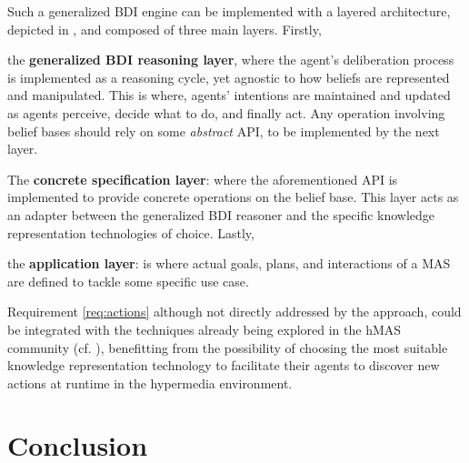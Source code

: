 \documentclass[
]{ceurart}
\begin{document}
Such a generalized \ac{BDI} engine can be implemented with a layered architecture,
depicted in , and composed of three main layers.
%
Firstly,
\begin{enumerate*}[label={\arabic*.}]
  \item the \textbf{generalized \ac{BDI} reasoning layer},
  where the agent's deliberation process is implemented as a reasoning cycle,
  yet agnostic to how beliefs are represented and manipulated.
  This is where,
  agents' intentions are maintained
  and updated as agents perceive,
  decide what to do,
  and finally act.
  Any operation involving belief bases should rely on some \emph{abstract} \acs{API},
  to be implemented by the next layer.
  \item The \textbf{concrete specification layer}:
  where the aforementioned \acs{API} is implemented to provide concrete operations on the belief base.
  This layer acts as an adapter between the generalized \ac{BDI} reasoner
  and the specific knowledge representation technologies of choice.
  Lastly,
  \item the \textbf{application layer}:
  is where actual goals, plans, and interactions of a \ac{MAS} are defined
  to tackle some specific use case.
\end{enumerate*}


Requirement \ref{req:actions} although not directly addressed by the approach,
could be integrated with the techniques already being explored in the \ac{hMAS} community (cf. ), benefitting from the possibility of choosing the most suitable knowledge representation technology
to facilitate their agents to discover new actions at runtime in the hypermedia environment.

\section{Conclusion}
\label{sec:conclusion}
\end{document}
